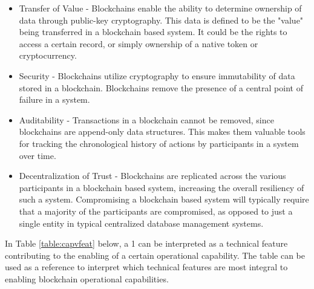\documentclass[12pt]{report}
\begin{document}
\begin{itemize}
\item Transfer of Value - Blockchains enable the ability to determine ownership of data through public-key cryptography. This data is defined to be the "value" being transferred in a blockchain based system. It could be the rights to access a certain record, or simply ownership of a native token or cryptocurrency. 
\item Security - Blockchains utilize cryptography to ensure immutability of data stored in a blockchain. Blockchains remove the presence of a central point of failure in a system.
\item Auditability - Transactions in a blockchain cannot be removed, since blockchains are append-only data structures. This makes them valuable tools for tracking the chronological history of actions by participants in a system over time.
\item Decentralization of Trust - Blockchains are replicated across the various participants in a blockchain based system, increasing the overall resiliency of such a system. Compromising a blockchain based system will typically require that a majority of the participants are compromised, as opposed to just a single entity in typical centralized database management systems.
\end{itemize}

In Table \ref{table:capvfeat} below, a 1 can be interpreted as a technical feature contributing to the enabling of a certain operational capability. The table can be used as a reference to interpret which technical features are most integral to enabling blockchain operational capabilities.

\begin{comment}
\begin{center}
\captionof{table}{Operational Capabilities vs Technical Features of Blockchains}
\begin{tabularx}{\columnwidth}{XXXXXXXXX}
 \hline
  \textbf{Capabilties/Features} & Immutable Ledger & Consensus & Smart Contracts & Multi-Sig & Cryptography & Asset Digitization & P2P & Total \\ 
 \hline
 \textbf{Transfer of Value} & 1 & 1 & 1 & 1 & 0 & 1 & 0 & 5 \\
 \hline
 \textbf{Security} & 1 & 1 & 1 & 1 & 1 & 0 & 0 & 5 \\
 \hline
 \textbf{Auditability} & 1 & 1 & 0 & 0 & 1 & 1 & 0 & 4 \\
 \hline
 \textbf{Decentralization of Trust} & 1 & 1 & 1 & 0 & 0 & 0 & 1 & 4 \\
 \hline
 \textbf{Total} & 4 & 4 & 3 & 2 & 2 & 2 & 1 & . \\
 \hline
\label{table:capvfeat}
\end{tabularx}
\end{center}
\end{comment}
\end{document}
